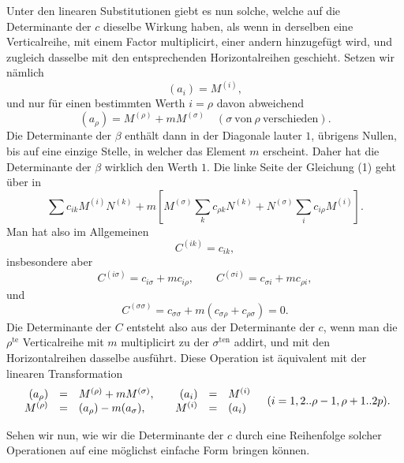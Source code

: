 \documentclass[10pt]{article}
\begin{document}
Unter den linearen Substitutionen giebt es nun solche, welche auf die Determinante der \(c\) dieselbe Wirkung haben, als wenn in derselben eine Verticalreihe, mit einem Factor multiplicirt, einer andern hinzugefügt wird, und zugleich dasselbe mit den entsprechenden Horizontalreihen geschieht. Setzen wir nämlich
\[
(a_i)=M^{(i)},
\]
und nur für einen bestimmten Werth \(i=\rho\) davon abweichend
\[
(a_\rho)=M^{(\rho)}+mM^{(\sigma)}\quad(\sigma\ \text{von}\ \rho\ \text{verschieden}).
\]
Die Determinante der \(\beta\) enthält dann in der Diagonale lauter \(1\), übrigens Nullen, bis auf eine einzige Stelle, in welcher das Element \(m\) erscheint. Daher hat die Determinante der \(\beta\) wirklich den Werth \(1\). Die linke Seite der Gleichung (1) geht über in
\[
\sum c_{ik}M^{(i)}N^{(k)}+
m\left[M^{(\sigma)}\sum_k c_{\rho k}N^{(k)}+
N^{(\sigma)}\sum_i c_{i\rho}M^{(i)}\right].
\]
Man hat also im Allgemeinen
\[
C^{(ik)}=c_{ik},
\]
insbesondere aber
\[
C^{(i\sigma)}=c_{i\sigma}+mc_{i\rho},\qquad
C^{(\sigma i)}=c_{\sigma i}+mc_{\rho i},
\]
und
\[
C^{(\sigma\sigma)}=c_{\sigma\sigma}+m(c_{\sigma\rho}+c_{\rho\sigma})=0.
\]
Die Determinante der \(C\) entsteht also aus der Determinante der \(c\), wenn man die \(\rho^{\mathrm{te}}\) Verticalreihe mit \(m\) multiplicirt zu der \(\sigma^{\mathrm{ten}}\) addirt, und mit den Horizontalreihen dasselbe ausführt. Diese Operation ist äquivalent mit der linearen Transformation
\[
\begin{array}{rcl@{\qquad}rcl}
(a_\rho)&=&M^{(\rho)}+mM^{(\sigma)},&(a_i)&=&M^{(i)}\\
M^{(\rho)}&=&(a_\rho)-m(a_\sigma),&M^{(i)}&=&(a_i)
\end{array}
\quad(i=1,2..\rho-1,\rho+1..2p).
\]

Sehen wir nun, wie wir die Determinante der \(c\) durch eine Reihenfolge solcher Operationen auf eine möglichst einfache Form bringen können.
\end{document}
